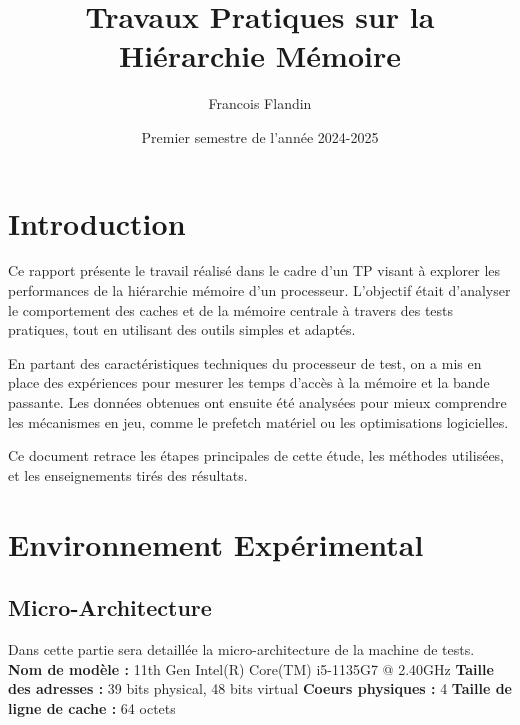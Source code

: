 \documentclass{rapport}
\title{Travaux Pratiques sur la Hiérarchie Mémoire }
\author{Francois Flandin}
\date{Premier semestre de l'année 2024-2025}
\begin{document}
    \maketitle


    \clearpage
    \tableofcontents

    \clearpage

    \section{Introduction}
    Ce rapport présente le travail réalisé dans le cadre d’un TP visant à explorer les performances de la hiérarchie mémoire d’un processeur. L’objectif était d’analyser le comportement des caches et de la mémoire centrale à travers des tests pratiques, tout en utilisant des outils simples et adaptés.

    En partant des caractéristiques techniques du processeur de test, on a mis en place des expériences pour mesurer les temps d’accès à la mémoire et la bande passante. Les données obtenues ont ensuite été analysées pour mieux comprendre les mécanismes en jeu, comme le prefetch matériel ou les optimisations logicielles.
    
    Ce document retrace les étapes principales de cette étude, les méthodes utilisées, et les enseignements tirés des résultats.

    \section*{Environnement Expérimental}
    \subsection*{Micro-Architecture}
    Dans cette partie sera detaillée la micro-architecture de la machine de tests.
    \newline\newline
    \textbf{Nom de modèle :} 11th Gen Intel(R) Core(TM) i5-1135G7 @ 2.40GHz
    \newline
    \textbf{Taille des adresses :} 39 bits physical, 48 bits virtual
    \newline
    \textbf{Coeurs physiques :} 4
    \newline
    \textbf{Taille de ligne de cache :} 64 octets
\end{document}
